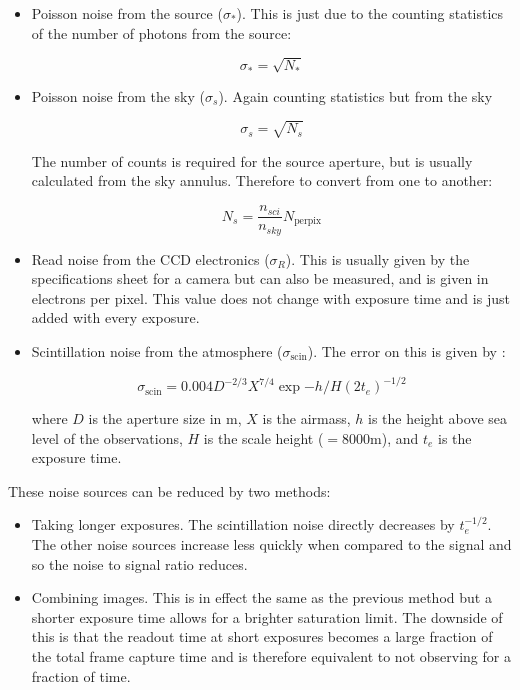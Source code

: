 \documentclass[11pt,a4paper]{report}
\begin{document}
\begin{itemize}
    \item Poisson noise from the source ($\sigma_{\ast}$). This is 
        just due to the counting statistics of the number of
        photons from the source:

        \[
            \sigma_{\ast} = \sqrt{N_{\ast}}
            \]

    \item Poisson noise from the sky ($\sigma_s$). Again counting 
        statistics but from the sky

        \[
            \sigma_{s} = \sqrt{N_{s}}
            \]

        The number of counts is required for the source aperture, but is
        usually calculated from the sky annulus. Therefore to convert
        from one to another:

        \[
            N_s = \frac{n_{sci}}{n_{sky}} N_{\mathrm{per pix}}
            \]

    \item Read noise from the CCD electronics ($\sigma_R$). This is 
        usually given by the specifications sheet for a camera
        but can also be measured, and is given in electrons per pixel.
        This value does not change with exposure time and is just added
        with every exposure. 

    \item Scintillation noise from the atmosphere
        ($\sigma_{\mathrm{scin}}$). The error on this is given by
        \citet{southworth09}:


        \[
            \sigma_{\mathrm{scin}} = 0.004
            D^{-2/3}X^{7/4}\exp{-h/H}\left(2t_e\right)^{-1/2}
            \label{eq:scintillation}
            \]

        where $D$ is the aperture size in m, $X$ is the airmass, $h$ is
        the height above sea level of the observations, $H$ is the scale
        height ($= 8000$m), and $t_e$ is the exposure time.
\end{itemize}

These noise sources can be reduced by two methods:

\begin{itemize}
    \item Taking longer exposures. The scintillation noise directly
        decreases by $t_e^{-1/2}$. The other noise sources increase less
        quickly when compared to the signal and so the noise to signal
        ratio reduces.
    \item Combining images. This is in effect the same as the previous
        method but a shorter exposure time allows for a brighter
        saturation limit. The downside of this is that the readout time
        at short exposures becomes a large fraction of the total frame
        capture time and is therefore equivalent to not observing for a
        fraction of time.
\end{itemize}
\end{document}
